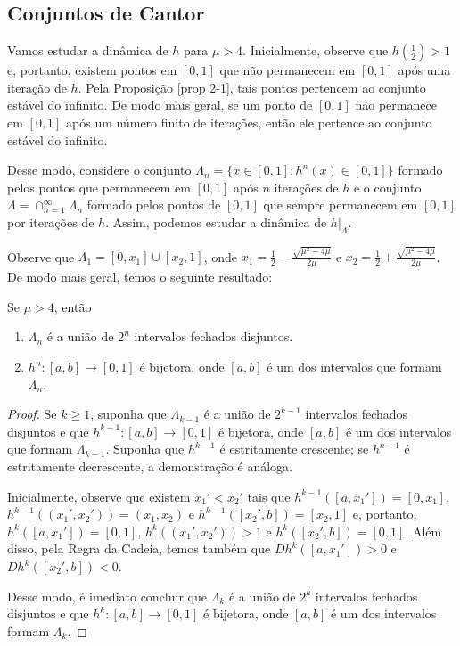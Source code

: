 \subsection{Conjuntos de Cantor}

Vamos estudar a dinâmica de $h$ para $\mu > 4$.
Inicialmente, observe que $h(\frac{1}{2}) > 1$ e, portanto, existem pontos em $[0, 1]$ que não permanecem em $[0, 1]$ após uma iteração de $h$.
Pela Proposição \ref{prop 2-1}, tais pontos pertencem ao conjunto estável do infinito.
De modo mais geral, se um ponto de $[0, 1]$ não permanece em $[0, 1]$ após um número finito de iterações, então ele pertence ao conjunto estável do infinito.

Desse modo, considere o conjunto $\Lambda_n = \lbrace x \in [0, 1] : h^n(x) \in [0, 1] \rbrace$ formado pelos pontos que permanecem em $[0, 1]$ após $n$ iterações de $h$ e o conjunto $\Lambda =  \cap_{n = 1}^\infty \Lambda_n$ formado pelos pontos de $[0, 1]$ que sempre permanecem em $[0, 1]$ por iterações de $h$. Assim, podemos estudar a dinâmica de $h|_\Lambda$.

Observe que $\Lambda_1 = [0, x_1] \cup [x_2, 1]$, onde $x_1 = \frac{1}{2} - \frac{\sqrt{\mu^2 - 4\mu}}{2\mu}$ e $x_2 = \frac{1}{2} + \frac{\sqrt{\mu^2 - 4\mu}}{2\mu}$. De modo mais geral, temos o seguinte resultado:

\begin{proposition}
Se $\mu > 4$, então
\begin{enumerate}
\item $\Lambda_n$ é a união de $2^n$ intervalos fechados disjuntos.
\item $h^n: [a, b] \to [0, 1]$ é bijetora, onde $[a, b]$ é um dos intervalos que formam $\Lambda_n$.
\end{enumerate}
\end{proposition}

\begin{proof}
Se $k \geq 1$, suponha que $\Lambda_{k-1}$ é a união de $2^{k-1}$ intervalos fechados disjuntos e que $h^{k-1}: [a, b] \to [0, 1]$ é bijetora, onde $[a, b]$ é um dos intervalos que formam $\Lambda_{k-1}$.
Suponha que $h^{k-1}$ é estritamente crescente; se $h^{k-1}$ é estritamente decrescente, a demonstração é análoga.

Inicialmente, observe que existem $x_1' < x_2'$ tais que $h^{k-1}([a, x_1']) = [0, x_1]$, $h^{k-1}((x_1', x_2')) = (x_1, x_2)$ e $h^{k-1}([x_2', b]) = [x_2, 1]$ e, portanto, $h^k([a, x_1']) = [0, 1]$, $h^k((x_1', x_2')) > 1$  e $h^k([x_2', b]) = [0, 1]$.
Além disso, pela Regra da Cadeia, temos também que $D h^k([a, x_1']) > 0$ e $D h^k([x_2', b]) < 0$.

Desse modo, é imediato concluir que $\Lambda_k$ é a união de $2^k$ intervalos fechados disjuntos e que $h^k: [a, b] \to [0, 1]$ é bijetora, onde $[a, b]$ é um dos intervalos formam $\Lambda_k$.
\end{proof}


